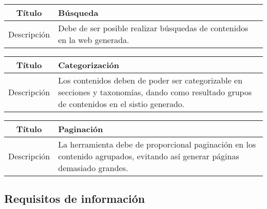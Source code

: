 \begin{center}

    \begin{tabularx}{\textwidth}{|c|X|}
        \hline
        Título & Búsqueda\\

        \hline

        Descripción & Debe de ser posible realizar búsquedas de contenidos en la web generada.\\

        \hline
    \end{tabularx}
\end{center}

\begin{center}

    \begin{tabularx}{\textwidth}{|c|X|}
        \hline
        Título & Categorización\\

        \hline

        Descripción & Los contenidos deben de poder ser categorizable en secciones y taxonomías,
        dando como resultado grupos de contenidos en el sistio generado.\\

        \hline
    \end{tabularx}
\end{center}

\begin{center}

    \begin{tabularx}{\textwidth}{|c|X|}
        \hline
        Título & Paginación\\

        \hline

        Descripción & La herramienta debe de proporcional paginación en los contenido agrupados, 
        evitando así generar páginas demasiado grandes.\\

        \hline
    \end{tabularx}
\end{center}

\subsection{Requisitos de información}

